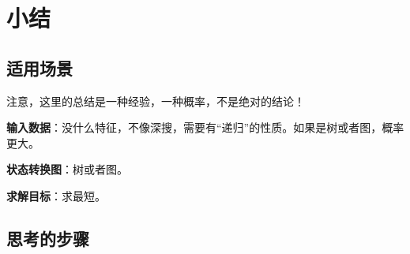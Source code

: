 \section{小结} %
\label{sec:bfs-template}


\subsection{适用场景}
注意，这里的总结是一种经验，一种概率，不是绝对的结论！

\textbf{输入数据}：没什么特征，不像深搜，需要有“递归”的性质。如果是树或者图，概率更大。

\textbf{状态转换图}：树或者图。

\textbf{求解目标}：求最短。


\subsection{思考的步骤}
